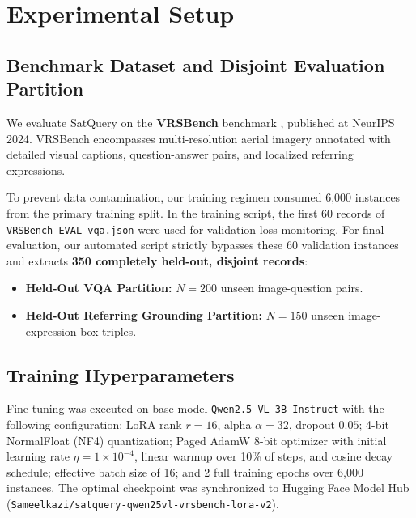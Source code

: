 \documentclass[lettersize,journal]{IEEEtran}
\begin{document}
\section{Experimental Setup}

\subsection{Benchmark Dataset and Disjoint Evaluation Partition}
We evaluate SatQuery on the \textbf{VRSBench} benchmark \cite{xiang2024vrsbench}, published at NeurIPS 2024. VRSBench encompasses multi-resolution aerial imagery annotated with detailed visual captions, question-answer pairs, and localized referring expressions.

To prevent data contamination, our training regimen consumed 6,000 instances from the primary training split. In the training script, the first 60 records of \texttt{VRSBench\_EVAL\_vqa.json} were used for validation loss monitoring. For final evaluation, our automated script strictly bypasses these 60 validation instances and extracts \textbf{350 completely held-out, disjoint records}:
\begin{itemize}
    \item \textbf{Held-Out VQA Partition:} $N = 200$ unseen image-question pairs.
    \item \textbf{Held-Out Referring Grounding Partition:} $N = 150$ unseen image-expression-box triples.
\end{itemize}

\subsection{Training Hyperparameters}
Fine-tuning was executed on base model \texttt{Qwen2.5-VL-3B-Instruct} with the following configuration: LoRA rank $r=16$, alpha $\alpha=32$, dropout $0.05$; 4-bit NormalFloat (NF4) quantization; Paged AdamW 8-bit optimizer with initial learning rate $\eta = 1 \times 10^{-4}$, linear warmup over 10\% of steps, and cosine decay schedule; effective batch size of 16; and 2 full training epochs over 6,000 instances. The optimal checkpoint was synchronized to Hugging Face Model Hub (\texttt{Sameelkazi/satquery-qwen25vl-vrsbench-lora-v2}).
\end{document}
